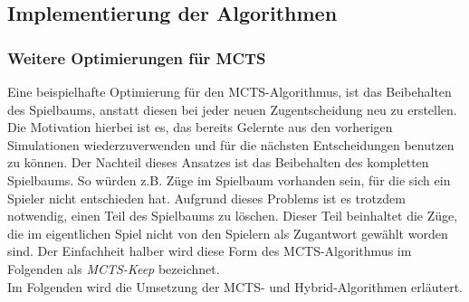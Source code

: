 \documentclass[12pt,a4paper,bibliography=totocnumbered,listof=totocnumbered]{article}
\begin{document}
\subsection{Implementierung der Algorithmen}
 
\subsubsection{Weitere Optimierungen für MCTS} \label{sec:optimi}
Eine beispielhafte Optimierung für den MCTS-Algorithmus, ist das Beibehalten des Spielbaums, anstatt diesen bei jeder neuen Zugentscheidung neu zu erstellen. Die Motivation hierbei ist es, das bereits Gelernte aus den vorherigen Simulationen wiederzuverwenden und für die nächsten Entscheidungen benutzen zu können. Der Nachteil dieses Ansatzes ist das Beibehalten des kompletten Spielbaums. So würden z.B. Züge im Spielbaum vorhanden sein, für die sich ein Spieler nicht entschieden hat. Aufgrund dieses Problems ist es trotzdem notwendig, einen Teil des Spielbaums zu löschen. Dieser Teil beinhaltet die Züge, die im eigentlichen Spiel nicht von den Spielern als Zugantwort gewählt worden sind. Der Einfachheit halber wird diese Form des MCTS-Algorithmus im Folgenden als \emph{MCTS-Keep} bezeichnet.\\
Im Folgenden wird die Umsetzung der MCTS- und Hybrid-Algorithmen erläutert.
\end{document}
